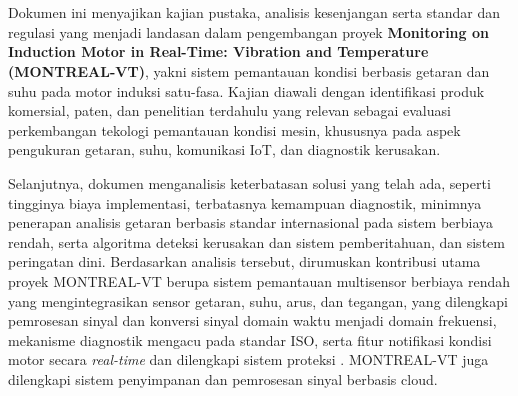 \documentclass{elsinta}
\begin{document}
\coverpage
\newpage




\clearpage
{}
\setcounter{page}{1} 
\pagestyle{myfooter} %


\tableofcontents
\newpage
\section*{\docsumary}
Dokumen ini menyajikan kajian pustaka, analisis kesenjangan serta standar dan regulasi yang menjadi landasan dalam pengembangan proyek \textbf{Monitoring on Induction Motor in Real-Time: Vibration and Temperature (MONTREAL-VT)}, yakni sistem pemantauan kondisi berbasis getaran dan suhu pada motor induksi satu-fasa. Kajian diawali dengan identifikasi produk komersial, paten, dan penelitian terdahulu yang relevan sebagai evaluasi perkembangan tekologi pemantauan kondisi mesin, khususnya pada aspek pengukuran getaran, suhu, komunikasi IoT, dan diagnostik kerusakan.

Selanjutnya, dokumen menganalisis keterbatasan solusi yang telah ada, seperti tingginya biaya implementasi, terbatasnya kemampuan diagnostik, minimnya penerapan analisis getaran berbasis standar internasional pada sistem berbiaya rendah, serta algoritma deteksi kerusakan dan sistem pemberitahuan, dan sistem peringatan dini. Berdasarkan analisis tersebut, dirumuskan kontribusi utama proyek MONTREAL-VT berupa sistem pemantauan multisensor berbiaya rendah yang mengintegrasikan sensor getaran, suhu, arus, dan tegangan, yang dilengkapi pemrosesan sinyal dan konversi sinyal domain waktu menjadi domain frekuensi, mekanisme diagnostik mengacu pada standar ISO, serta fitur notifikasi kondisi motor secara \textit{real-time} dan dilengkapi sistem proteksi
. MONTREAL-VT juga dilengkapi sistem penyimpanan dan pemrosesan sinyal berbasis cloud.
\end{document}
